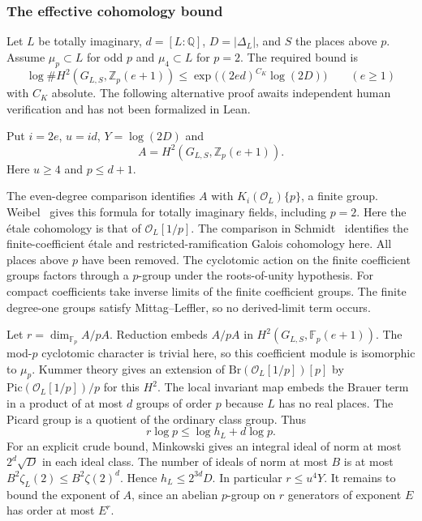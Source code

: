 \subsubsection{The effective cohomology bound}\label{tw:effectiveK}

Let $L$ be totally imaginary, $d=[L:\mathbb Q]$, $D=|\Delta_L|$, and $S$ the places above $p$. Assume $\mu_p\subset L$ for odd $p$ and $\mu_4\subset L$ for $p=2$. The required bound is
\[
 \log\#H^2(G_{L,S},\mathbb Z_p(e+1))
       \le \exp\big((2ed)^{C_K}\log(2D)\big)
 \qquad(e\ge1)
\]
with $C_K$ absolute. The following alternative proof awaits independent human verification and has not been formalized in Lean.

Put $i=2e$, $u=id$, $Y=\log(2D)$ and
\[ A=H^2(G_{L,S},\mathbb Z_p(e+1)). \]
Here $u\ge4$ and $p\le d+1$.

The even-degree comparison identifies $A$ with $K_i(\mathcal O_L)\{p\}$, a finite group. Weibel~\cite[Thm.~73]{weibelK} gives this formula for totally imaginary fields, including $p=2$. Here the étale cohomology is that of $\mathcal O_L[1/p]$. The comparison in Schmidt~\cite[Prop.~2.3 and its proof]{badSchmidt} identifies the finite-coefficient étale and restricted-ramification Galois cohomology here. All places above $p$ have been removed. The cyclotomic action on the finite coefficient groups factors through a $p$-group under the roots-of-unity hypothesis. For compact coefficients take inverse limits of the finite coefficient groups. The finite degree-one groups satisfy Mittag–Leffler, so no derived-limit term occurs.

Let $r=\dim_{\mathbb F_p} A/pA$. Reduction embeds $A/pA$ in $H^2(G_{L,S},\mathbb F_p(e+1))$. The mod-$p$ cyclotomic character is trivial here, so this coefficient module is isomorphic to $\mu_p$. Kummer theory gives an extension of $\mathrm{Br}(\mathcal O_L[1/p])[p]$ by $\mathrm{Pic}(\mathcal O_L[1/p])/p$ for this $H^2$. The local invariant map embeds the Brauer term in a product of at most $d$ groups of order $p$ because $L$ has no real places. The Picard group is a quotient of the ordinary class group. Thus
\[r\log p\le\log h_L+d\log p.\]
For an explicit crude bound, Minkowski gives an integral ideal of norm at most $2^d\sqrt D$ in each ideal class. The number of ideals of norm at most $B$ is at most $B^2\zeta_L(2)\le B^2\zeta(2)^d$. Hence $h_L\le 2^{3d}D$. In particular $r\le u^4Y$. It remains to bound the exponent of $A$, since an abelian $p$-group on $r$ generators of exponent $E$ has order at most $E^r$.

